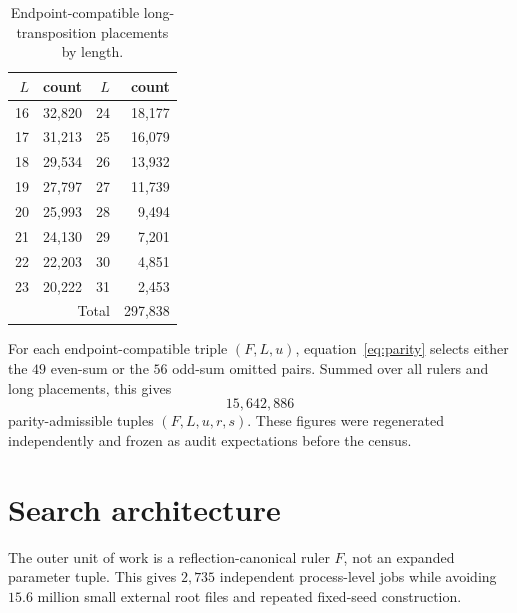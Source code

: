 \documentclass[11pt,a4paper]{article}
\theoremstyle{definition}\newtheorem{definition}[theorem]{Definition}\newtheorem{remark}[theorem]{Remark}
\begin{document}
\begin{table}[ht]
\centering
\caption{Endpoint-compatible long-transposition placements by length.}
\label{tab:longL}
\begin{tabular}{r r@{\qquad}r r}
\toprule
$L$ & count & $L$ & count\\
\midrule
16 & 32,820 & 24 & 18,177\\
17 & 31,213 & 25 & 16,079\\
18 & 29,534 & 26 & 13,932\\
19 & 27,797 & 27 & 11,739\\
20 & 25,993 & 28 & 9,494\\
21 & 24,130 & 29 & 7,201\\
22 & 22,203 & 30 & 4,851\\
23 & 20,222 & 31 & 2,453\\
\midrule
\multicolumn{3}{r}{Total} & 297,838\\
\bottomrule
\end{tabular}
\end{table}

For each endpoint-compatible triple $(F,L,u)$, equation~\eqref{eq:parity} selects either the $49$ even-sum or the $56$ odd-sum omitted pairs.  Summed over all rulers and long placements, this gives
\[
15{,}642{,}886
\]
parity-admissible tuples $(F,L,u,r,s)$.  These figures were regenerated independently and frozen as audit expectations before the census.

\section{Search architecture}
The outer unit of work is a reflection-canonical ruler $F$, not an expanded parameter tuple.  This gives $2{,}735$ independent process-level jobs while avoiding $15.6$ million small external root files and repeated fixed-seed construction.
\end{document}
